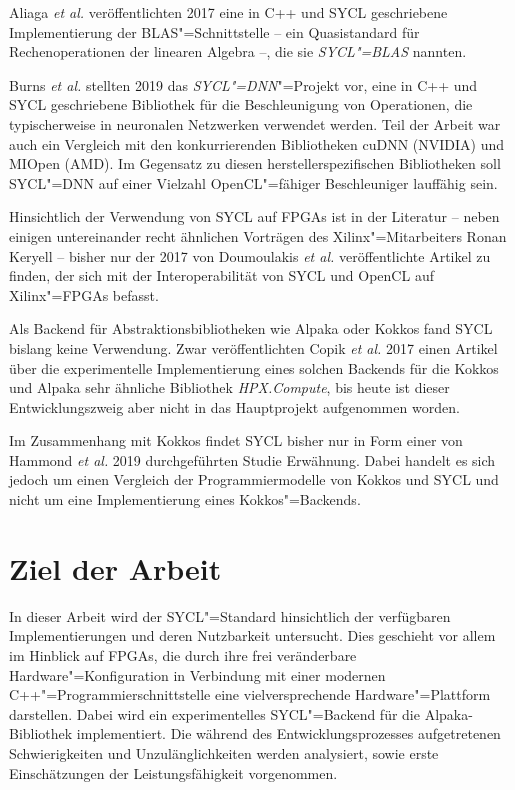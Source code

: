 Aliaga \textit{et al.} veröffentlichten 2017 eine in C++ und SYCL geschriebene
Implementierung der BLAS"=Schnittstelle -- ein Quasistandard für
Rechenoperationen der linearen Algebra --, die sie \textit{SYCL"=BLAS} nannten.
\cite[vgl.][]{aliaga2017}

Burns \textit{et al.} stellten 2019 das \textit{SYCL"=DNN}"=Projekt vor, eine in
C++ und SYCL geschriebene Bibliothek für die Beschleunigung von Operationen, die
typischerweise in neuronalen Netzwerken verwendet werden. Teil der Arbeit war
auch ein Vergleich mit den konkurrierenden Bibliotheken cuDNN (NVIDIA) und
MIOpen (AMD). Im Gegensatz zu diesen herstellerspezifischen Bibliotheken soll
SYCL"=DNN auf einer Vielzahl OpenCL"=fähiger Beschleuniger lauffähig sein.
\cite[vgl.][]{burns2019}

Hinsichtlich der Verwendung von SYCL auf FPGAs ist in der Literatur -- neben
einigen untereinander recht ähnlichen Vorträgen des Xilinx"=Mitarbeiters Ronan
Keryell -- bisher nur der 2017 von Doumoulakis \textit{et al.} veröffentlichte
Artikel zu finden, der sich mit der Interoperabilität von SYCL und OpenCL auf
Xilinx"=FPGAs befasst.
\cite[vgl.][]{doumoulakis2017}

Als Backend für Abstraktionsbibliotheken wie Alpaka oder Kokkos fand SYCL
bislang keine Verwendung. Zwar veröffentlichten Copik \textit{et al.} 2017 einen
Artikel über die experimentelle Implementierung eines solchen Backends für die
Kokkos und Alpaka sehr ähnliche Bibliothek \textit{HPX.Compute}, bis heute ist
dieser Entwicklungszweig aber nicht in das Hauptprojekt aufgenommen worden.
\cite[vgl.][]{copik2017}

Im Zusammenhang mit Kokkos findet SYCL bisher nur in Form einer von Hammond
\textit{et al.} 2019 durchgeführten Studie Erwähnung. Dabei handelt es sich
jedoch um einen Vergleich der Programmiermodelle von Kokkos und SYCL und nicht
um eine Implementierung eines Kokkos"=Backends.
\cite[vgl.][]{hammond2019}

\section{Ziel der Arbeit}\label{einleitung:ziel}

In dieser Arbeit wird der SYCL"=Standard hinsichtlich der verfügbaren
Implementierungen und deren Nutzbarkeit untersucht. Dies geschieht vor allem im
Hinblick auf FPGAs, die durch ihre frei veränderbare Hardware"=Konfiguration in
Verbindung mit einer modernen C++"=Programmierschnittstelle eine
vielversprechende Hardware"=Plattform darstellen. Dabei wird ein
experimentelles SYCL"=Backend für die Alpaka-Bibliothek implementiert. Die
während des Entwicklungsprozesses aufgetretenen Schwierigkeiten und
Unzulänglichkeiten werden analysiert, sowie erste Einschätzungen der
Leistungsfähigkeit vorgenommen.

